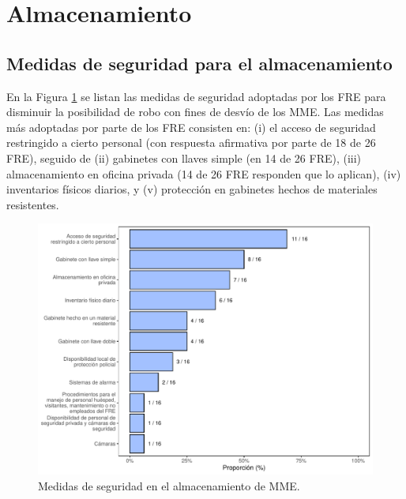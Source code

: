\documentclass[
]{book}
\begin{document}
\hypertarget{almacenamiento}{%
\section{Almacenamiento}\label{almacenamiento}}

\hypertarget{medidas-de-seguridad-para-el-almacenamiento}{%
\subsection{Medidas de seguridad para el almacenamiento}\label{medidas-de-seguridad-para-el-almacenamiento}}


En la Figura \ref{fig:MedidasSeguridadAlmacenamientoMME} se listan las medidas de seguridad adoptadas por los FRE para disminuir la posibilidad de robo con fines de desvío de los MME. Las medidas más adoptadas por parte de los FRE consisten en: (i) el acceso de seguridad restringido a cierto personal (con respuesta afirmativa por parte de 18 de 26 FRE), seguido de (ii) gabinetes con llaves simple (en 14 de 26 FRE), (iii) almacenamiento en oficina privada (14 de 26 FRE responden que lo aplican), (iv) inventarios físicos diarios, y (v) protección en gabinetes hechos de materiales resistentes.

\begin{figure}[!t]

{\centering \includegraphics[width=0.95\linewidth]{InformeFinal_files/figure-latex/MedidasSeguridadAlmacenamientoMME-1} 

}

\caption{Medidas de seguridad en el almacenamiento de MME.}\label{fig:MedidasSeguridadAlmacenamientoMME}
\end{figure}
\end{document}

